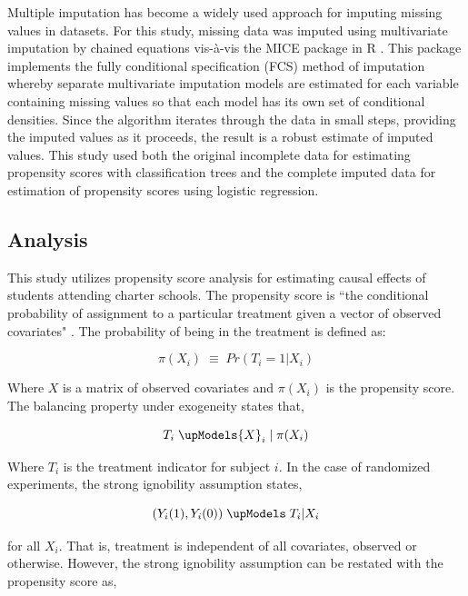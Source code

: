 \documentclass[letterpaper,12pt]{article} %
\begin{document}
Multiple imputation \cite{rubin1987,Rubin1996mi} has become a widely used approach for imputing missing values in datasets. For this study, missing data was imputed using multivariate imputation by chained equations vis-\`{a}-vis the MICE package \cite{mice,vanbuuren} in R \cite{rdevelopment}. This package implements the fully conditional specification (FCS) method of imputation whereby separate multivariate imputation models are estimated for each variable containing missing values so that each model has its own set of conditional densities. Since the algorithm iterates through the data in small steps, providing the imputed values as it proceeds, the result is a robust estimate of imputed values. This study used both the original incomplete data for estimating propensity scores with classification trees and the complete imputed data for estimation of propensity scores using logistic regression.

\subsection{Analysis}

This study utilizes propensity score analysis for estimating causal effects of students attending charter schools. The propensity score is ``the conditional probability of assignment to a particular treatment given a vector of observed covariates" \cite{RosenbaumRubin1983}. The probability of being in the treatment is defined as:

\begin{equation}
\pi ({ X }_{ i }) \; \equiv \; Pr({ T }_{ i } = 1 | { X }_{ i })
\end{equation}

\noindent Where $X$ is a matrix of observed covariates and $\pi ({ X }_{ i })$ is the propensity score. The balancing property under exogeneity states that,

\begin{equation}
{ T }_{ i } \; \upModels { X }_{ i } \;| \; \pi ({ X }_{ i })
\end{equation}

\noindent Where $T_i$ is the treatment indicator for subject $i$. In the case of randomized experiments, the strong ignobility assumption states,

\begin{equation}
({ Y }_{ i }(1),{ Y }_{ i }(0)) \; \upModels \; { T }_{ i }|{ X }_{ i }
\end{equation}

\noindent for all ${X}_{i}$. That is, treatment is independent of all covariates, observed or otherwise. However, the strong ignobility assumption can be restated with the propensity score as,
\end{document}
